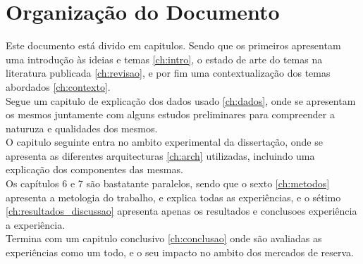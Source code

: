 \section{Organização do Documento \label{se:organização}}

Este documento está divido em capitulos. Sendo que os primeiros apresentam uma introdução às ideias e temas \ref{ch:intro}, o estado de arte do temas na literatura publicada \ref{ch:revisao}, e por fim uma contextualização dos temas abordados \ref{ch:contexto}. \\
Segue um capitulo de explicação dos dados usado \ref{ch:dados}, onde se apresentam os mesmos juntamente com alguns estudos preliminares para compreender a naturuza e qualidades dos mesmos. \\

O capitulo seguinte entra no ambito experimental da dissertação, onde se apresenta as diferentes arquitecturas \ref{ch:arch} utilizadas, incluindo uma explicação dos componentes das mesmas. \\

Os capítulos 6 e 7 são bastatante paralelos, sendo que o sexto \ref{ch:metodos} apresenta a metologia do trabalho, e explica todas as experiências, e o sétimo \ref{ch:resultados_discussao} apresenta apenas os resultados e conclusoes experiência a experiência. \\

Termina com um capitulo conclusivo \ref{ch:conclusao} onde são avaliadas as experiências como um todo, e o seu impacto no ambito dos mercados de reserva. \\

